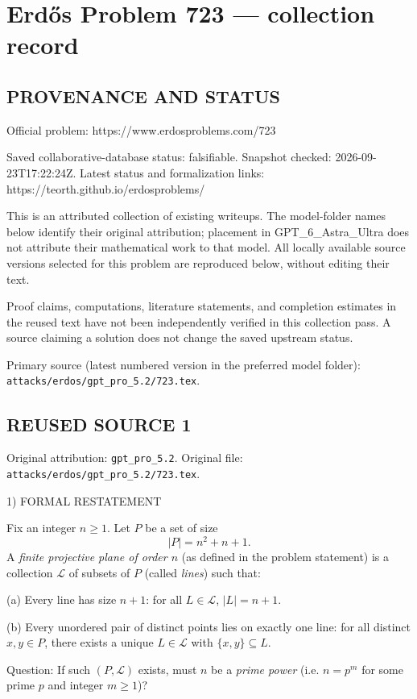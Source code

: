 \section*{Erd\H{o}s Problem 723 --- collection record}

\subsection*{PROVENANCE AND STATUS}
Official problem: https://www.erdosproblems.com/723

Saved collaborative-database status: falsifiable.
Snapshot checked: 2026-09-23T17:22:24Z.
Latest status and formalization links: https://teorth.github.io/erdosproblems/

This is an attributed collection of existing writeups. The model-folder names below identify their original attribution; placement in GPT\_6\_Astra\_Ultra does not attribute their mathematical work to that model. All locally available source versions selected for this problem are reproduced below, without editing their text.

Proof claims, computations, literature statements, and completion estimates in the reused text have not been independently verified in this collection pass. A source claiming a solution does not change the saved upstream status.

Primary source (latest numbered version in the preferred model folder): \texttt{attacks/erdos/gpt\_pro\_5.2/723.tex}.

\subsection*{REUSED SOURCE 1}
Original attribution: \texttt{gpt\_pro\_5.2}.
Original file: \texttt{attacks/erdos/gpt\_pro\_5.2/723.tex}.


1) FORMAL RESTATEMENT

Fix an integer $n\ge 1$. Let $P$ be a set of size
\[
|P| = n^2+n+1.
\]
A \emph{finite projective plane of order $n$} (as defined in the problem statement) is a collection $\mathcal L$ of subsets of $P$ (called \emph{lines}) such that:

(a) Every line has size $n+1$: for all $L\in\mathcal L$, $|L|=n+1$.

(b) Every unordered pair of distinct points lies on exactly one line: for all distinct $x,y\in P$, there exists a unique $L\in\mathcal L$ with $\{x,y\}\subseteq L$.

Question: If such $(P,\mathcal L)$ exists, must $n$ be a \emph{prime power} (i.e. $n=p^m$ for some prime $p$ and integer $m\ge 1$)?

